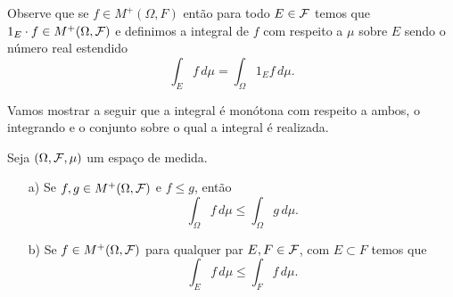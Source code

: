 Observe que se $f\in M^{+}(\Omega,F)$ então para
todo $E\in\mathcal{F}$ temos que $1_E\cdot f\in M^{+}(\Omega,\mathcal{F})$
e definimos a integral de $f$ com respeito a $\mu$ 
sobre $E$ sendo o número real estendido 
	\[
		\int_{E} f\, d\mu
		=
		\int_{\Omega} 1_{E}f\, d\mu.
	\]

Vamos mostrar a seguir que a integral é monótona 
com respeito a ambos, o integrando e o conjunto
sobre o qual a integral é realizada.






\begin{lema}
\label{lema-monotonicidade-integral-funcao-nao-negativas}
Seja $(\Omega,\mathcal{F},\mu)$ um espaço de medida.
\begin{itemize}
	\item[a)]
	Se $f,g\in M^{+}(\Omega,\mathcal{F})$	 e $f\leq g$, então 
		\[
			\int_{\Omega} f\, d\mu
			\leq
			\int_{\Omega} g\, d\mu.
		\]
	
	\item[b)] 
	Se $f\in M^{+}(\Omega,\mathcal{F})$ para 
	qualquer par $E,F\in \mathcal{F}$, com 
	$E\subset F$ temos que 
		\[
			\int_{E} f\, d\mu
			\leq
			\int_{F} f\, d\mu.
		\]
	 
\end{itemize}
\end{lema}










